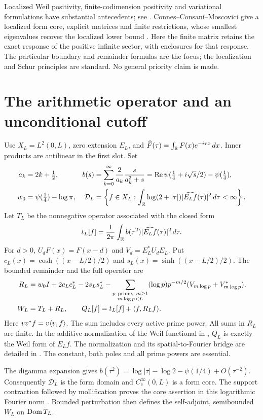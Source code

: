 Localized Weil positivity, finite-codimension positivity and variational
formulations have substantial antecedents; see \cite[Section 1]{Suzuki}.
Connes--Consani--Moscovici give a localized form core, explicit matrices and
finite restrictions, whose smallest eigenvalues recover the localized
lower bound \cite[Proposition 3.4 and Sections 4--5]{CCM}.
Here the finite matrix retains the exact response of the positive infinite
sector, with enclosures for that response. The particular boundary and
remainder formulas are the focus; the localization and Schur principles
are standard. No general priority claim is made.

\section{The arithmetic operator and an unconditional cutoff}
Use $X_L=L^2(0,L)$, zero extension $E_L$, and
$\widehat F(\tau)=\int_\mathbb R F(x)e^{-i\tau x}\,dx$. Inner products are
antilinear in the first slot. Set
\begin{align}
a_k&=2k+\tfrac12,&
b(s)&=\sum_{k=0}^{\infty}\frac2{a_k}\frac{s}{a_k^2+s}
=\operatorname{Re}\psi(\tfrac14+i\sqrt{s}/2)-\psi(\tfrac14),\label{eq:b}\\
w_0&=\psi(\tfrac14)-\log\pi,&
\mathcal D_L&=\left\{f\in X_L:
\int_\mathbb R\log(2+|\tau|)|\widehat{E_Lf}(\tau)|^2\,d\tau<\infty\right\}.
\end{align}
Let $T_L$ be the nonnegative operator associated with the closed form
\[
t_L[f]=\frac1{2\pi}\int_\mathbb R b(\tau^2)|\widehat{E_Lf}(\tau)|^2\,d\tau.
\]
For $d>0$, $U_dF(x)=F(x-d)$ and $V_d=E_L^*U_dE_L$. Put
$c_L(x)=\cosh((x-L/2)/2)$ and $s_L(x)=\sinh((x-L/2)/2)$.
The bounded remainder and the full operator are
\begin{align}
R_L={}&w_0I+2c_Lc_L^*-2s_Ls_L^*
-\sum_{\substack{p\ \mathrm{prime},\ m\ge1\\m\log p<L}}
 (\log p)p^{-m/2}(V_{m\log p}+V_{m\log p}^*),\label{eq:remainder}\\
W_L={}&T_L+R_L,\qquad Q_L[f]=t_L[f]+\langle f,R_Lf\rangle.\label{eq:weil}
\end{align}
Here $vv^*f=v\langle v,f\rangle$. The sum includes every active prime power.
All sums in $R_L$ are finite. In the additive normalization of the Weil
functional in \cite[Section 1.1]{Suzuki}, $Q_L$ is exactly the Weil form of
$E_Lf$. The normalization and its spatial-to-Fourier bridge are detailed in
\cite[Sections 2--3]{Companion}. The constant, both poles and all prime
powers are essential.

The digamma expansion \cite{DLMF} gives
$b(\tau^2)=\log|\tau|-\log2-\psi(1/4)+O(\tau^{-2})$.
Consequently $\mathcal D_L$ is the form domain and $C_c^\infty(0,L)$ is
a form core. The support contraction followed by mollification proves the
core assertion in this logarithmic Fourier norm \cite[Section 3]{Companion}.
Bounded perturbation then
defines the self-adjoint, semibounded $W_L$ on $\operatorname{Dom} T_L$.

